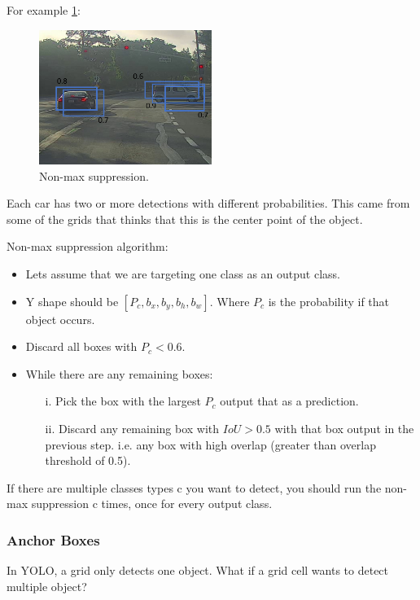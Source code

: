 For example \ref{nms}:

\begin{figure}[!htbp]
    \centering
    \includegraphics[width=0.5\textwidth, trim={0 0 0 0}, clip]{img/c4/nms.png}
    \caption{Non-max suppression.}
    \label{nms}
\end{figure}

Each car has two or more detections with different probabilities. This came from some of the grids that thinks that this is the center point of the object.

Non-max suppression algorithm:

\begin{itemize}
    \item Lets assume that we are targeting one class as an output class.
    \item Y shape should be $[P_c, b_x, b_y, b_h, b_w]$. Where $P_c$ is the probability if that object occurs.
    \item Discard all boxes with $P_c < 0.6$.
    \item While there are any remaining boxes:
    \begin{itemize}
        \item[i.] Pick the box with the largest $P_c$ output that as a prediction.
        \item[ii.] Discard any remaining box with $IoU > 0.5$ with that box output in the previous step. i.e. any box with high overlap (greater than overlap threshold of 0.5).
    \end{itemize}
\end{itemize}

If there are multiple classes types c you want to detect, you should run the non-max suppression c times, once for every output class.

\subsubsection{Anchor Boxes}
In YOLO, a grid only detects one object. What if a grid cell wants to detect multiple object?

